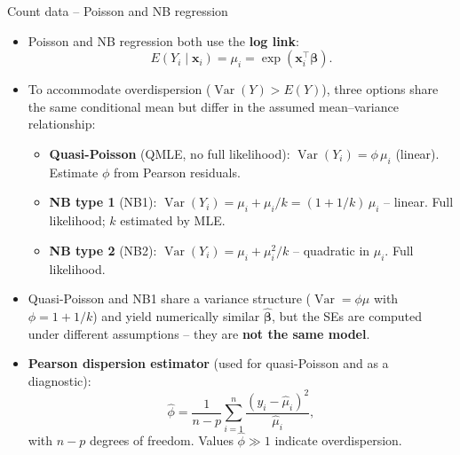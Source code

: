 \documentclass[10pt,ignorenonframetext,aspectratio=169]{beamer}
\begin{document}
\begin{frame}{Count data -- Poisson and NB regression}
    \begin{itemize}
    \justifying
        \item Poisson and NB regression both use the \textbf{log link}:
        \begin{equation}
            E(Y_{i} \mid \mathbf{x}_{i}) = \mu_{i} = \exp\!\left(\mathbf{x}_{i}^{\top} \boldsymbol{\beta}\right).
        \end{equation}
        \item To accommodate overdispersion ($\operatorname{Var}(Y) > E(Y)$), three options share the same conditional mean but differ in the assumed mean--variance relationship:
        \begin{itemize}
            \item \textbf{Quasi-Poisson} (QMLE, no full likelihood): $\operatorname{Var}(Y_i) = \phi\, \mu_i$ (linear). Estimate $\phi$ from Pearson residuals.
            \item \textbf{NB type 1} (NB1): $\operatorname{Var}(Y_i) = \mu_i + \mu_i / k = (1 + 1/k)\, \mu_i$ -- linear. Full likelihood; $k$ estimated by MLE.
            \item \textbf{NB type 2} (NB2): $\operatorname{Var}(Y_i) = \mu_i + \mu_i^2 / k$ -- quadratic in $\mu_i$. Full likelihood.
        \end{itemize}
        \item Quasi-Poisson and NB1 share a variance structure ($\operatorname{Var} = \phi\mu$ with $\phi = 1 + 1/k$) and yield numerically similar $\hat{\boldsymbol{\beta}}$, but the SEs are computed under different assumptions -- they are \textbf{not the same model}.
        \item \textbf{Pearson dispersion estimator} (used for quasi-Poisson and as a diagnostic):
        \[
        \hat{\phi} = \frac{1}{n - p}\sum_{i=1}^{n} \frac{(y_{i} - \hat{\mu}_{i})^{2}}{\hat{\mu}_{i}},
        \]
        with $n - p$ degrees of freedom. Values $\hat{\phi} \gg 1$ indicate overdispersion.
    \end{itemize}
\end{frame}
\end{document}
